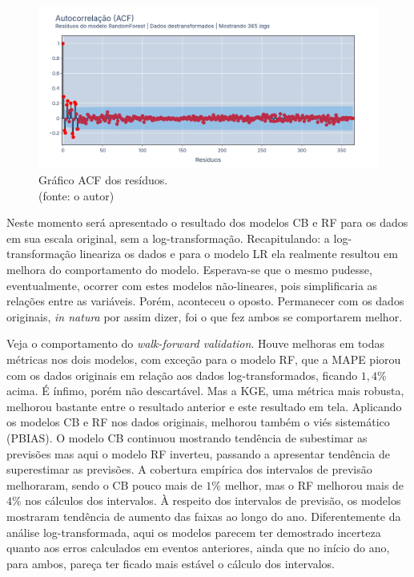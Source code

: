 \begin{figure}[!h]
\centering
\includegraphics[scale=0.33]{Figuras/jequiti/resultados/RF_WFV_LOG_RESID_ACF.png}
\caption{Gráfico ACF dos resíduos.\\(fonte: o autor)}
\label{fig:jequiti_RF_WFV_LOG_RESID_ACF}
\end{figure}
\clearpage

Neste momento será apresentado o resultado dos modelos CB e RF para os dados em sua escala original, sem a log-transformação. Recapitulando: a log-transformação lineariza os dados e para o modelo LR ela realmente resultou em melhora do comportamento do modelo. Esperava-se que o mesmo pudesse, eventualmente, ocorrer com estes modelos não-lineares, pois simplificaria as relações entre as variáveis. Porém, aconteceu o oposto. Permanecer com os dados originais, \textit{in natura} por assim dizer, foi o que fez ambos se comportarem melhor.

Veja o comportamento do \textit{walk-forward validation}. Houve melhoras em todas métricas nos dois modelos, com exceção para o modelo RF, que a MAPE piorou com os dados originais em relação aos dados log-transformados, ficando $1,4\%$ acima. É ínfimo, porém não descartável. Mas a KGE, uma métrica mais robusta, melhorou bastante entre o resultado anterior e este resultado em tela. Aplicando os modelos CB e RF nos dados originais, melhorou também o viés sistemático (PBIAS). O modelo CB continuou mostrando tendência de subestimar as previsões mas aqui o modelo RF inverteu, passando a apresentar tendência de superestimar as previsões. A cobertura empírica dos intervalos de previsão melhoraram, sendo o CB pouco mais de $1\%$ melhor, mas o RF melhorou mais de $4\%$ nos cálculos dos intervalos. À respeito dos intervalos de previsão, os modelos mostraram tendência de aumento das faixas ao longo do ano. Diferentemente da análise log-transformada, aqui os modelos parecem ter demostrado incerteza quanto aos erros calculados em eventos anteriores, ainda que no início do ano, para ambos, pareça ter ficado mais estável o cálculo dos intervalos.

